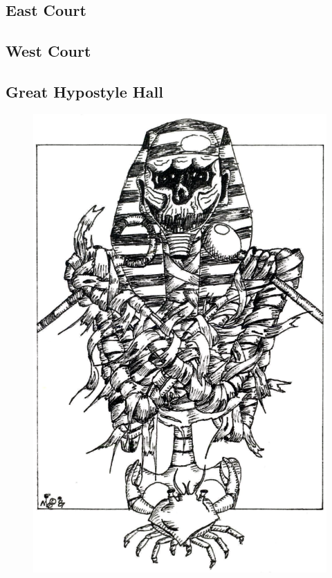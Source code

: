 \documentclass[a4paper,serif]{module}
\begin{document}
\begin{boxtext}
\lipsum[3]
\end{boxtext}

\lipsum[4]

\subsection{East Court} %

\lipsum[5]

\subsection{West Court} %

\lipsum[6]

\subsection{Great Hypostyle Hall} %
\label{hypostyle_hall}


\begin{figure}[t]
\includegraphics[width=\columnwidth]{module_art_interior.png}
\label{img:tomb}
\end{figure}
\end{document}
